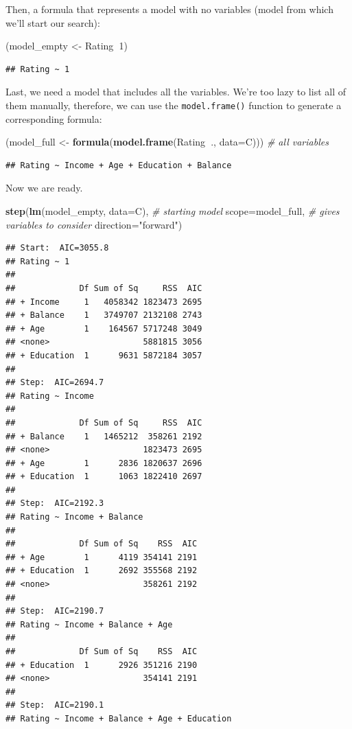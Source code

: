 \documentclass[10pt,b5paper,krantz1]{krantz}
\newenvironment{Shaded}{\begin{snugshade}}{\end{snugshade}}
\newcommand{\CommentTok}[1]{\textcolor[rgb]{0.37,0.37,0.37}{\textit{#1}}}
\newcommand{\DataTypeTok}[1]{\textcolor[rgb]{0.27,0.27,0.27}{#1}}
\newcommand{\DecValTok}[1]{\textcolor[rgb]{0.06,0.06,0.06}{#1}}
\newcommand{\KeywordTok}[1]{\textcolor[rgb]{0.27,0.27,0.27}{\textbf{#1}}}
\newcommand{\NormalTok}[1]{#1}
\newcommand{\OperatorTok}[1]{\textcolor[rgb]{0.43,0.43,0.43}{\textbf{#1}}}
\newcommand{\StringTok}[1]{\textcolor[rgb]{0.5,0.5,0.5}{#1}}
\begin{document}
Then, a formula that represents a model with no variables
(model from which we'll start our search):

\begin{Shaded}
\begin{Highlighting}[]
\NormalTok{(model_empty <-}\StringTok{ }\NormalTok{Rating}\OperatorTok{~}\DecValTok{1}\NormalTok{)}
\end{Highlighting}
\end{Shaded}

\begin{verbatim}
## Rating ~ 1
\end{verbatim}

Last, we need a model that includes all the variables.
We're too lazy to list all of them manually, therefore,
we can use the \texttt{model.frame()} function to generate
a corresponding formula:

\begin{Shaded}
\begin{Highlighting}[]
\NormalTok{(model_full <-}\StringTok{ }\KeywordTok{formula}\NormalTok{(}\KeywordTok{model.frame}\NormalTok{(Rating}\OperatorTok{~}\NormalTok{., }\DataTypeTok{data=}\NormalTok{C))) }\CommentTok{# all variables}
\end{Highlighting}
\end{Shaded}

\begin{verbatim}
## Rating ~ Income + Age + Education + Balance
\end{verbatim}

Now we are ready.

\begin{Shaded}
\begin{Highlighting}[]
\KeywordTok{step}\NormalTok{(}\KeywordTok{lm}\NormalTok{(model_empty, }\DataTypeTok{data=}\NormalTok{C), }\CommentTok{# starting model}
    \DataTypeTok{scope=}\NormalTok{model_full,         }\CommentTok{# gives variables to consider}
    \DataTypeTok{direction=}\StringTok{"forward"}\NormalTok{)}
\end{Highlighting}
\end{Shaded}

\begin{verbatim}
## Start:  AIC=3055.8
## Rating ~ 1
## 
##             Df Sum of Sq     RSS  AIC
## + Income     1   4058342 1823473 2695
## + Balance    1   3749707 2132108 2743
## + Age        1    164567 5717248 3049
## <none>                   5881815 3056
## + Education  1      9631 5872184 3057
## 
## Step:  AIC=2694.7
## Rating ~ Income
## 
##             Df Sum of Sq     RSS  AIC
## + Balance    1   1465212  358261 2192
## <none>                   1823473 2695
## + Age        1      2836 1820637 2696
## + Education  1      1063 1822410 2697
## 
## Step:  AIC=2192.3
## Rating ~ Income + Balance
## 
##             Df Sum of Sq    RSS  AIC
## + Age        1      4119 354141 2191
## + Education  1      2692 355568 2192
## <none>                   358261 2192
## 
## Step:  AIC=2190.7
## Rating ~ Income + Balance + Age
## 
##             Df Sum of Sq    RSS  AIC
## + Education  1      2926 351216 2190
## <none>                   354141 2191
## 
## Step:  AIC=2190.1
## Rating ~ Income + Balance + Age + Education
\end{verbatim}
\end{document}
